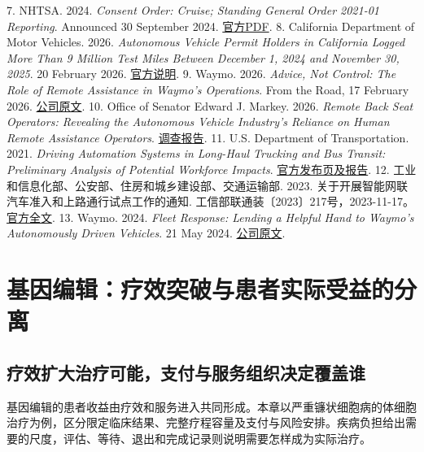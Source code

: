 \documentclass[UTF8,fontset=windows,12pt,a4paper,oneside,openany]{ctexbook}
\begin{document}
7. NHTSA. 2024. \emph{Consent Order: Cruise; Standing General Order 2021-01 Reporting}. Announced 30 September 2024. \href{https://www.nhtsa.gov/sites/nhtsa.gov/files/2024-09/cruise-consent-order-2024-web.pdf}{官方PDF}.
8. California Department of Motor Vehicles. 2026. \emph{Autonomous Vehicle Permit Holders in California Logged More Than 9 Million Test Miles Between December 1, 2024 and November 30, 2025}. 20 February 2026. \href{https://www.dmv.ca.gov/portal/news-and-media/autonomous-vehicle-permit-holders-in-california-logged-more-than-9-million-test-miles-between-december-1-2024-and-november-30-2025/}{官方说明}.
9. Waymo. 2026. \emph{Advice, Not Control: The Role of Remote Assistance in Waymo’s Operations}. From the Road, 17 February 2026. \href{https://waymo.com/blog/shorts/advice-not-control-the-role-of-remote-assistance/}{公司原文}.
10. Office of Senator Edward J. Markey. 2026. \emph{Remote Back Seat Operators: Revealing the Autonomous Vehicle Industry’s Reliance on Human Remote Assistance Operators}. \href{https://www.markey.senate.gov/imo/media/doc/remote_assistance_investigation_report.pdf}{调查报告}.
11. U.S. Department of Transportation. 2021. \emph{Driving Automation Systems in Long-Haul Trucking and Bus Transit: Preliminary Analysis of Potential Workforce Impacts}. \href{https://www.transportation.gov/av/workforce/report}{官方发布页及报告}.
12. 工业和信息化部、公安部、住房和城乡建设部、交通运输部. 2023. 关于开展智能网联汽车准入和上路通行试点工作的通知. 工信部联通装〔2023〕217号，2023-11-17。\href{https://ythxxfb.miit.gov.cn/ythzxfwpt/hlwmh/tzgg/xzxk/clsczr/art/2023/art_ae314a1df30e4ba1a49bd4ffa10186f6.html}{官方全文}.
13. Waymo. 2024. \emph{Fleet Response: Lending a Helpful Hand to Waymo’s Autonomously Driven Vehicles}. 21 May 2024. \href{https://waymo.com/blog/2024/05/fleet-response/}{公司原文}.

\chapter{基因编辑：疗效突破与患者实际受益的分离}\label{ch:11}

\section{疗效扩大治疗可能，支付与服务组织决定覆盖谁}

基因编辑的患者收益由疗效和服务进入共同形成。本章以严重镰状细胞病的体细胞治疗为例，区分限定临床结果、完整疗程容量及支付与风险安排。疾病负担给出需要的尺度，评估、等待、退出和完成记录则说明需要怎样成为实际治疗。
\end{document}
